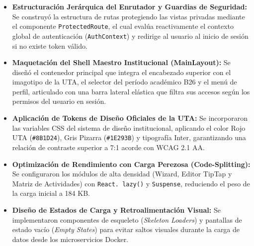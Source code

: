 \documentclass[12pt,a4paper]{article}
\begin{document}
\begin{itemize}[leftmargin=1.5em, itemsep=4pt]
    \item \textbf{Estructuración Jerárquica del Enrutador y Guardias de Seguridad:} Se construyó la estructura de rutas protegiendo las vistas privadas mediante el componente \texttt{ProtectedRoute}, el cual evalúa reactivamente el contexto global de autenticación (\texttt{AuthContext}) y redirige al usuario al inicio de sesión si no existe token válido.
    \item \textbf{Maquetación del Shell Maestro Institucional (MainLayout):} Se diseñó el contenedor principal que integra el encabezado superior con el imagotipo de la UTA, el selector del período académico B26 y el menú de perfil, articulado con una barra lateral elástica que filtra sus accesos según los permisos del usuario en sesión.
    \item \textbf{Aplicación de Tokens de Diseño Oficiales de la UTA:} Se incorporaron las variables CSS del sistema de diseño institucional, aplicando el color Rojo UTA (\texttt{\#8B1D24}), Gris Pizarra (\texttt{\#1E293B}) y tipografía Inter, garantizando una relación de contraste superior a 7:1 acorde con WCAG 2.1 AA.
    \item \textbf{Optimización de Rendimiento con Carga Perezosa (Code-Splitting):} Se configuraron los módulos de alta densidad (Wizard, Editor TipTap y Matriz de Actividades) con \texttt{React. lazy()} y \texttt{Suspense}, reduciendo el peso de la carga inicial a 184 KB.
    \item \textbf{Diseño de Estados de Carga y Retroalimentación Visual:} Se implementaron componentes de esqueleto (\textit{Skeleton Loaders}) y pantallas de estado vacío (\textit{Empty States}) para evitar saltos visuales durante la carga de datos desde los microservicios Docker.
\end{itemize}
\end{document}
